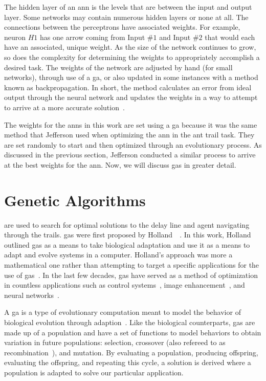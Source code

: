 The hidden layer of an \gls{ann} is the levels that are between the input and output layer. Some networks may contain numerous hidden layers or none at all. The connections between the perceptrons have associated weights. For example, neuron $H1$ has one arrow coming from Input $\#1$ and Input $\#2$ that would each have an associated, unique weight. As the size of the network continues to grow, so does the complexity for determining the weights to appropriately accomplish a desired task. The weights of the network are adjusted by hand (for small networks), through use of a \gls{ga}, or also updated in some instances with a method known as backpropagation. In short, the method calculates an error from ideal output through the neural network and updates the weights in a way to attempt to arrive at a more accurate solution~\cite{Rumelhart1988-hm}.

The weights for the \glspl{ann} in this work are set using a \gls{ga} because it was the same method that Jefferson used when optimizing the \gls{ann} in the ant trail task. They are set randomly to start and then optimized through an evolutionary process. As discussed in the previous section, Jefferson conducted a similar process to arrive at the best weights for the \gls{ann}. Now, we will discuss \glspl{ga} in greater detail. 

\section{Genetic Algorithms}
 are used to search for optimal solutions to the delay line and agent navigating through the trails. \Glspl{ga} were first proposed by Holland~\cite{Holland1962-uk}~\cite{Holland1975-di}. In this work, Holland outlined \glspl{ga} as a means to take biological adaptation and use it as a means to adapt and evolve systems in a computer. Holland's approach was more a mathematical one rather than attempting to target a specific applications for the use of \glspl{ga}~\cite{Mitchell1998-tw}. In the last few decades, \glspl{ga} have served as a method of optimization in countless applications such as control systems~\cite{Fleming2002-br}, image enhancement~\cite{Pal1994-zb}, and neural networks~\cite{Menczer1994-vx}.

A \Gls{ga} is a type of evolutionary computation meant to model the behavior of biological evolution through adaption~\cite{Baeck2000-co}. Like the biological counterparts, \Glspl{ga} are made up of a population and have a set of functions to model behaviors to obtain variation in future populations: selection, crossover (also refereed to as recombination~\cite{Mitchell1998-tw}), and mutation. By evaluating a population, producing offspring, evaluating the offspring, and repeating this cycle, a solution is derived where a population is adapted to solve our particular application.

